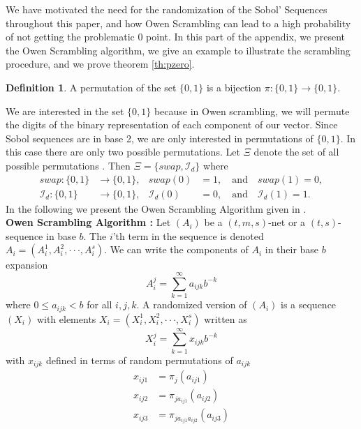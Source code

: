\documentclass{article}
\theoremstyle{definition}
\newtheorem{definition}{Definition}[section]
\begin{document}
\begin{appendices}
\label{app: Owen Scrambling}
We have motivated the need for the randomization of the Sobol' Sequences throughout this paper, and how Owen Scrambling can lead to a high probability of not getting the problematic 0 point. In this part of the appendix, we present the Owen Scrambling algorithm, we give an example to illustrate the scrambling procedure, and we prove theorem \ref{th:pzero}.
\begin{definition}
 A permutation of the set $\{0,1\}$ is a bijection \(
     \pi : \{0,1\} \longrightarrow \{0,1\}
\).
\end{definition}
 \noindent We are interested in the set $\{0,1\}$ because in Owen scrambling, we will permute the digits of the binary representation of each component of our vector. Since Sobol sequences are in base 2, we are only interested in permutations of $\{0,1\}$. In this case there are only two possible permutations. Let $\Xi$ denote the set of all possible permutations . Then \(\Xi=\{\textit{swap},\mathcal{I}_d\}\) 
where \begin{align*}
\textit{swap} : \{0,1\} &\longrightarrow \{0,1\},
& \textit{swap}(0) &= 1,\quad \text{and}\quad \textit{swap}(1)=0, \\
\mathcal{I}_d : \{0,1\} &\longrightarrow \{0,1\},
& \mathcal{I}_d(0) &= 0,\quad \text{and}\quad \mathcal{I}_d(1)=1.
\end{align*}
In the following we present the Owen Scrambling Algorithm given in \cite{OwenArtB.1995RP(m}.\\
\noindent\textbf{Owen Scrambling Algorithm :} 
Let $(A_i)$ be a $(t,m,s)$-net or a $(t,s)$-sequence in base $b$. The $i$'th term in the sequence is denoted $A_i=(A_i^1,A_i^2,\cdot\cdot\cdot,A_i^s)$. We can write the components of $A_i$ in their base $b$ expansion \begin{equation}
    A_i^j=\sum_{k=1}^{\infty}a_{ijk}b^{-k}
\end{equation} where $0\leq a_{ijk}<b$ for all $i,j,k$. A randomized version of $(A_i)$ is a sequence $(X_i)$ with elements $X_i=(X_i^1,X_i^2,\cdot\cdot\cdot,X_i^s)$ written as \begin{equation}
    X_i^j=\sum_{k=1}^{\infty}x_{ijk}b^{-k}
\end{equation} with $x_{ijk}$ defined in terms of random permutations of $a_{ijk}$
\begin{align*}
x_{ij1}&=\pi_j(a_{ij1})\\
x_{ij2}&=\pi_{ja_{ij1}}(a_{ij2})\\
x_{ij3}&=\pi_{ja_{ij1}a_{ij2}}(a_{ij3})\\

\end{align*}
\end{appendices}
\end{document}
